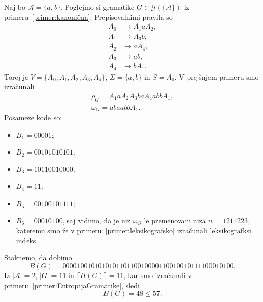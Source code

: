 \documentclass[fin1, tisk]{fmfdelo}
\providecommand{\abs}[1]{\left\lvert #1 \right\rvert}
\newcommand{\A}{\mathcal{A}}
\newcommand{\G}{\mathcal{G}}
\theoremstyle{definition}
\begin{document}
\begin{primer}
    Naj bo $\A = \{ a, b\}$. Poglejmo si gramatike $G \in \G(\{ \A \})$ iz primera~\ref{primer:kanonična}.
    Prepisovalnimi pravila so
    \begin{align*}
        A_0 &\rightarrow A_1aA_2, \\
        A_1 &\rightarrow A_3b, \\
        A_2 &\rightarrow aA_4, \\
        A_3 &\rightarrow ab, \\
        A_4 &\rightarrow bA_1.
    \end{align*}
    Torej je $V = \{ A_0, A_1, A_2, A_3, A_4 \}$, $\Sigma  = \{ a, b \}$ in $S=A_0$. V prejšnjem 
    primeru smo izračunali
    \begin{gather*}
        \rho_G = A_1aA_2A_3baA_4abbA_1, \\
        \omega_G = abaabbA_1.
    \end{gather*}
    Posameze kode so:
    \begin{itemize}
        \item $B_1 = 00001$;
        \item $B_2 = 00101010101$;
        \item $B_3 = 10110010000$;
        \item $B_4 = 11$;
        \item $B_5 = 00100101111$;
        \item $B_6 = 00010100$, saj vidimo, da je niz $\omega_G$ le premenovani niza $w = 1211223$,
        kateremu smo že v primeru~\ref{primer:leksikografsko} izračunali leksikografksi indeks.
    \end{itemize}
    Staknemo, da dobimo
    \[
        B(G) = 00001 00101010101 10110010000 11 00100101111 00010100.
    \]
    Iz $\abs{\A} = 2$, $\abs{G} = 11$ in $\lceil H(G) \rceil = 11$, kar smo izračunali v 
    primeru~\ref{primer:EntropijaGramatike}, sledi
    \[
        B(G) = 48 \leq 57.
    \]


\end{primer}
\end{document}
